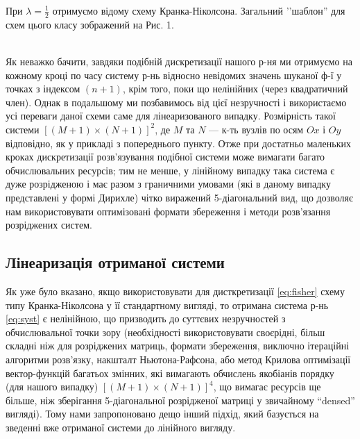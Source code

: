 При $\lambda = \frac{1}{2}$ отримуємо відому схему Кранка-Ніколсона. Загальний ’’шаблон'' для схем цього класу зображений на Рис. 1.
\begin{figure}[h]
\caption{}
\label{fig:fig1}
\end{figure} \\
Як неважко бачити, завдяки подібній дискретизації нашого р-ня ми отримуємо на кожному кроці по часу систему р-нь відносно невідомих значень шуканої ф-ї у точках з індексом $(n+1)$, крім того, поки що нелінійних (через квадратичний член). Однак в подальшому ми позбавимось від цієї незручності і використаємо усі переваги даної схеми саме для лінеаризованого випадку. Розмірність такої системи $[(M+1)\times(N+1)]^2$, де $M$ та $N$ --- к-ть вузлів по осям $Ox$ і $Oy$ відповідно, як у прикладі з попереднього пункту. Отже при достатньо маленьких кроках дискретизації розв’язування подібної системи може вимагати багато обчислювальних ресурсів;
тим не менше, у лінійному випадку така система є дуже розрідженою і  має разом з граничними умовами (які в даному випадку представлені у формі Дирихле) чітко виражений 5-діагональний вид, що дозволяє нам використовувати оптимізовані формати збереження і методи розв’язання розріджених систем.

\subsection{Лінеаризація отриманої системи}
Як уже було вказано, якщо використовувати для дисткретизації \eqref{eq:fisher} схему типу Кранка-Ніколсона у її стандартному вигляді, то отримана система р-нь \eqref{eq:syst} є нелінійною, що призводить до суттєвих незручностей з обчислювальної точки зору (необхідності використовувати своєрідні, більш складні ніж для розріджених матриць, формати збереження, виключно ітераційні алгоритми розв’язку, накшталт Ньютона-Рафсона, або метод Крилова оптимізації вектор-функцій багатьох змінних, які вимагають обчислень якобіанів порядку (для нашого випадку) $[(M+1)\times(N+1)]^4$, що вимагає ресурсів ще більше, ніж зберігання 5-діагональної розрідженої матриці у звичайному ``densed'' вигляді). Тому нами запропоновано дещо інший підхід, який базується на зведенні вже отриманої системи до лінійного вигляду.

